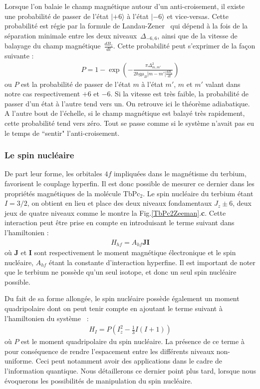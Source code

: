 Lorsque l'on balaie le champ magnétique autour d'un anti-croisement, il existe une probabilité de passer de l'état $|+6\rangle$ à l'état $|-6\rangle$ et vice-versas. Cette probabilité est régie par la formule de Landau-Zener~\cite{Zener1932} qui dépend à la fois de la séparation minimale entre les deux niveaux~$\Delta_{-6,6}$, ainsi que de la vitesse de balayage du champ magnétique~$\frac{dB_z}{dt}$. Cette probabilité peut s'exprimer de la façon suivante :
\begin{eqnarray}
P = 1 - \exp \left( -\frac{\pi \Delta^2_{m,m'}}{2 \hbar g \mu_B |m-m'|\frac{dB_z}{dt}} \right)
\end{eqnarray}
ou $P$ est la probabilité de passer de l'état $m$ à l'état $m'$, $m$ et $m'$ valant dans notre cas respectivement $+6$ et $-6$. Si la vitesse est très faible, la probabilité de passer d'un état à l'autre tend vers un. On retrouve ici le théorème adiabatique. A l'autre bout de l'échelle, si le champ magnétique est balayé très rapidement, cette probabilité tend vers zéro. Tout se passe comme si le système n'avait pas eu le temps de ``sentir" l'anti-croisement.




\subsubsection{Le spin nucléaire}
De part leur forme, les orbitales $4f$ impliquées dans le magnétisme du terbium, favorisent le couplage hyperfin. Il est donc possible de mesurer ce dernier dans les propriétés magnétiques de la molécule TbPc$_{2}$. Le spin nucléaire du terbium étant $I = 3/2$, on obtient en lieu et place des deux niveaux fondamentaux $J_z \pm 6$, deux jeux de quatre niveaux comme le montre la Fig.\ref{TbPc2Zeeman}.\textbf{c}. Cette interaction peut être prise en compte en introduisant le terme suivant dans l'hamiltonien :
\begin{eqnarray}
H_{hf} = A_{hf}\mathbf{J}\mathbf{I}
\end{eqnarray}
où $\mathbf{J}$ et $\mathbf{I}$ sont respectivement le moment magnétique électronique et le spin nucléaire, $A_{hf}$ étant la constante d'interaction hyperfine. Il est important de noter que le terbium ne possède qu'un seul isotope, et donc un seul spin nucléaire possible.

Du fait de sa forme allongée, le spin nucléaire possède également un moment quadripolaire dont on peut tenir compte en ajoutant le terme suivant à l'hamiltonien du système~\cite{Bleaney1961} :
\begin{eqnarray}
H_I = P\left(I_z^2 - \frac{1}{3}I(I+1)\right)
\end{eqnarray}
où $P$ est le moment quadripolaire du spin nucléaire. La présence de ce terme à pour conséquence de rendre l'espacement entre les différents niveaux non-uniforme. Ceci peut notamment avoir des applications dans le cadre de l'information quantique. Nous détaillerons ce dernier point plus tard, lorsque nous évoquerons les possibilités de manipulation du spin nucléaire.



